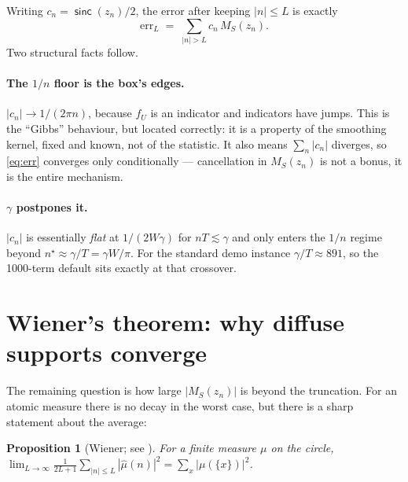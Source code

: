 \documentclass[11pt]{article}
\newtheorem{proposition}{Proposition}
\newcommand{\sinck}{\operatorname{\mathsf{sinc}}}
\begin{document}
Writing $c_n=\sinck(z_n)/2$, the error after keeping $|n|\le L$ is exactly
\begin{equation}
  \label{eq:err}
  \mathrm{err}_L\;=\;\sum_{|n|>L}c_n\,M_S(z_n).
\end{equation}
Two structural facts follow.

\paragraph{The $1/n$ floor is the box's edges.} $|c_n|\to 1/(2\pi n)$, because $f_U$ is an
indicator and indicators have jumps. This is the ``Gibbs'' behaviour, but located correctly: it is a
property of the smoothing kernel, fixed and known, not of the statistic. It also means
$\sum_n|c_n|$ diverges, so \eqref{eq:err} converges only conditionally — cancellation in
$M_S(z_n)$ is not a bonus, it is the entire mechanism.

\paragraph{$\gamma$ postpones it.} $|c_n|$ is essentially \emph{flat} at $1/(2W\gamma)$ for
$nT\lesssim\gamma$ and only enters the $1/n$ regime beyond $n^\star\approx\gamma/T=\gamma W/\pi$.
For the standard demo instance $\gamma/T\approx891$, so the 1000-term default sits exactly at that
crossover.

\section{Wiener's theorem: why diffuse supports converge}
\label{sec:wiener}

The remaining question is how large $|M_S(z_n)|$ is beyond the truncation. For an atomic measure
there is no decay in the worst case, but there is a sharp statement about the average:

\begin{proposition}[Wiener; see \citealt{katznelson2004}]
\label{prop:wiener}
For a finite measure $\mu$ on the circle,
$\displaystyle\lim_{L\to\infty}\frac1{2L+1}\sum_{|n|\le L}|\hat\mu(n)|^2=\sum_x|\mu(\{x\})|^2$.
\end{proposition}
\end{document}
